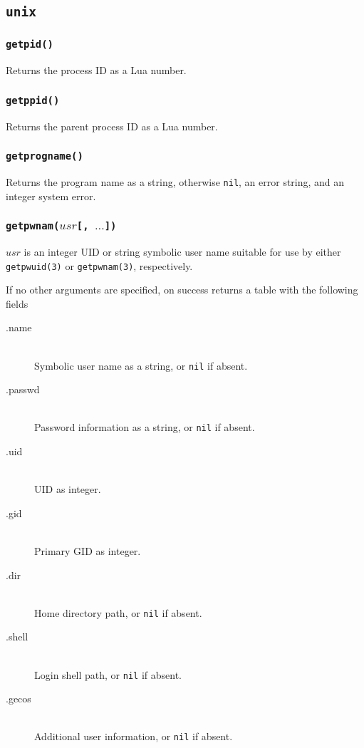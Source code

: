 \documentclass[11pt, oneside]{memoir}
\newcommand*{\nil}[0]{\texttt{nil}\xspace}
\newcommand*{\syscall}[1]{\texttt{#1}\xspace}
\newcommand*{\fn}[1]{\texttt{#1}\xspace}
\newcounter{toccols}
\newenvironment{Module}[1]{
	\subsection{\texttt{#1}}
	\addtocontents{toc}{
		\protect\begin{multicols}{\value{toccols}}
	}
}{
	\addtocontents{toc}{\protect\end{multicols}}
}
\begin{document}
\begin{Module}{unix}
\subsubsection[\fn{getpid}]{\fn{getpid()}}

Returns the process ID as a Lua number.

\subsubsection[\fn{getppid}]{\fn{getppid()}}

Returns the parent process ID as a Lua number.

\subsubsection[\fn{getprogname}]{\fn{getprogname()}}

Returns the program name as a string, otherwise \nil, an error string, and an integer system error.

\subsubsection[\fn{getpwnam}]{\fn{getpwnam($usr$[, $\ldots$])}}

$usr$ is an integer UID or string symbolic user name suitable for use by either \syscall{getpwuid(3)} or \syscall{getpwnam(3)}, respectively.

If no other arguments are specified, on success returns a table with the following fields

\begin{description}
\item[.name] \hfill \\
Symbolic user name as a string, or \nil if absent.
\item[.passwd] \hfill \\
Password information as a string, or \nil if absent.
\item[.uid] \hfill \\
UID as integer.
\item[.gid] \hfill \\
Primary GID as integer.
\item[.dir] \hfill \\
Home directory path, or \nil if absent.
\item[.shell] \hfill \\
Login shell path, or \nil if absent.
\item[.gecos] \hfill \\
Additional user information, or \nil if absent.
\end{description}


\end{Module}
\end{document}
